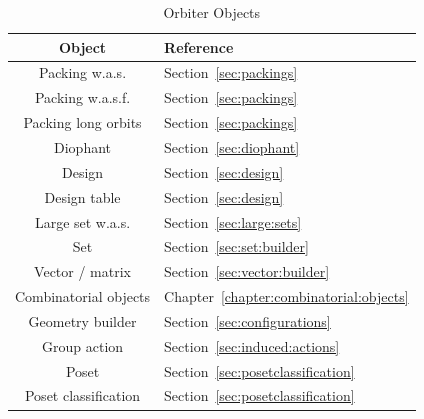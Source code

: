 \begin{table}
	\begin{center}
	{\renewcommand{\arraystretch}{2.1}
	\begin{tabular}{|c|l|}
		\hline
		Object & Reference \\
		\hline
		\hline
		Packing w.a.s. & Section~\ref{sec:packings} \\
		\hline
		Packing w.a.s.f. & Section~\ref{sec:packings} \\
		\hline
		Packing long orbits & Section~\ref{sec:packings} \\
		\hline
		Diophant & Section~\ref{sec:diophant} \\
		\hline
		Design & Section~\ref{sec:design} \\
		\hline
		Design table &  Section~\ref{sec:design} \\
		\hline
		Large set w.a.s. &  Section~\ref{sec:large:sets} \\
		\hline
		Set & Section~\ref{sec:set:builder} \\
		\hline
		Vector / matrix & Section~\ref{sec:vector:builder} \\
		\hline
		Combinatorial objects & Chapter~\ref{chapter:combinatorial:objects} \\
		\hline
		Geometry builder & Section~\ref{sec:configurations} \\
		\hline
		Group action & Section~\ref{sec:induced:actions} \\
		\hline
		Poset & Section~\ref{sec:posetclassification} \\
		\hline
		Poset classification & Section~\ref{sec:posetclassification} \\
		\hline
		\end{tabular}}
	\end{center}
	\caption{\label{tab:objects:2}Orbiter Objects}
\end{table}



